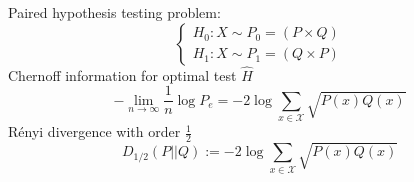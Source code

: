 \documentclass{beamer}
\begin{document}
\begin{frame}
Paired hypothesis testing problem:
\begin{equation*}
\begin{cases}
H_0: X \sim P_0=(P \times Q)\\
H_1: X \sim P_1=(Q \times P)
\end{cases}
\end{equation*}
Chernoff information for optimal test $\widehat{H}$
\begin{equation*}
-\lim_{n\to \infty} \frac{1}{n}\log P_e = -2 \log \sum_{x\in \mathcal{X}} \sqrt{P(x)Q(x)}
\end{equation*}
Rényi divergence with order $\frac{1}{2}$
\begin{equation*}
D_{1/2}(P||Q) := -2 \log \sum_{x\in \mathcal{X}} \sqrt{P(x)Q(x)}
\end{equation*}
\end{frame}
\end{document}
